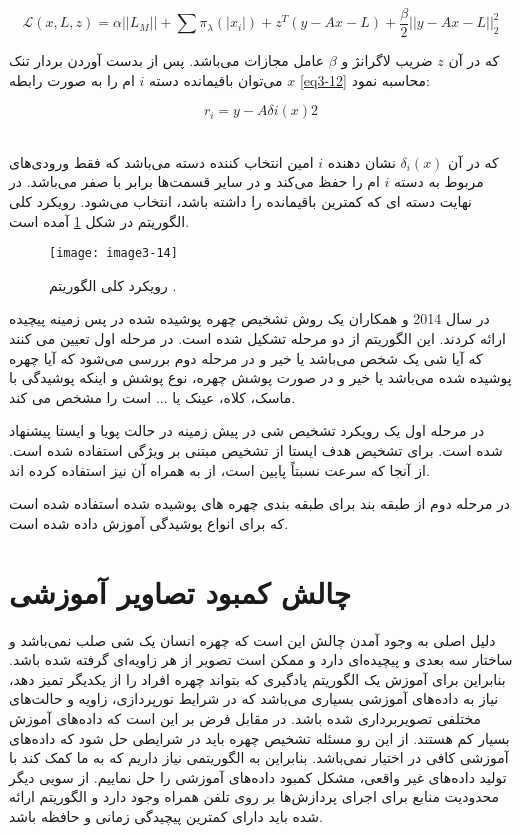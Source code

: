 \begin{equation}
\label{eq3-11}
\mathcal{L}(x,L,z) = \alpha ||L_M|| + \sum \pi_\lambda ( |x_i|) + z^T (y - Ax - L) + \frac{\beta}{2} ||y - Ax - L||_2^2
\end{equation}

\noindent‏
که در آن $z$ ضریب لاگرانژ و $\beta$ عامل مجازات می‌باشد. پس از بدست آوردن بردار تنک $x$ می‌توان باقیمانده دسته $i$ ام را به صورت رابطه \ref{eq3-12} محاسبه نمود:

\begin{equation}
\label{eq3-12}
r_i=y-Aδi(x)2
\end{equation}‏

\noindent‏
که در آن $\delta_i(x)$ نشان دهنده $i$ امین انتخاب کننده دسته می‌باشد که فقط ورودی‌های مربوط به دسته $i$ ام را حفظ می‌کند و در سایر قسمت‌ها برابر با صفر می‌باشد. در نهایت دسته ای که کمترین باقیمانده را داشته باشد، انتخاب می‌شود. رویکرد کلی الگوریتم در شکل \ref{image3-14} آمده است.

\begin{figure}[h]
\centering
  \texttt{[image: image3-14]}
  \caption{رویکرد کلی الگوریتم  \cite{WU2018256}.}
  \label{image3-14}
\end{figure}

\noindent
در سال 2014  و همکاران \cite{7015448} یک روش تشخیص چهره پوشیده شده در پس زمینه پیچیده ارائه کردند. این الگوریتم از دو مرحله تشکیل شده است. در مرحله اول تعیین می کنند که آیا شی یک شخص می‌باشد یا خیر و در مرحله دوم بررسی می‌شود که آیا چهره پوشیده شده می‌باشد یا خیر و در صورت پوشش چهره، نوع پوشش و اینکه پوشیدگی با ماسک، کلاه، عینک یا ... است را مشخص می کند.

\noindent
در مرحله اول یک رویکرد تشخیص شی در پیش زمینه در حالت پویا و ایستا پیشنهاد شده است. برای تشخیص هدف ایستا از تشخیص مبتنی بر ویژگی  استفاده شده است. از آنجا که سرعت  نسبتاً پایین است، از   به همراه آن نیز استفاده کرده اند. 

\noindent
در مرحله دوم از طبقه بند  برای طبقه بندی چهره های پوشیده شده استفاده شده است که برای انواع پوشیدگی آموزش داده شده است.

\section{چالش کمبود تصاویر آموزشی}
دلیل اصلی به وجود آمدن چالش‌ این است که چهره انسان یک شی صلب نمی‌باشد و ساختار سه بعدی و پیچیده‌ای دارد و ممکن است تصویر از هر زاویه‌ای گرفته شده باشد. بنابراین برای آموزش یک الگوریتم یادگیری که بتواند چهره افراد را از یکدیگر تمیز دهد، نیاز به داده‌های آموزشی بسیاری می‌باشد که در شرایط نورپردازی، زاویه و حالت‌های مختلفی تصویربرداری شده باشد. در مقابل فرض بر این است که داده‌های آموزش بسیار کم هستند. از این رو مسئله تشخیص چهره باید در شرایطی حل شود که داده‌های آموزشی کافی در اختیار نمی‌باشد. بنابراین به الگوریتمی نیاز داریم که به ما کمک کند با تولید داده‌های غیر واقعی، مشکل کمبود داده‌های آموزشی را حل نماییم. از سویی دیگر محدودیت‌ منابع برای اجرای پردازش‌ها بر روی تلفن همراه وجود دارد و الگوریتم ارائه شده باید دارای کمترین پیچیدگی زمانی و حافظه باشد.

